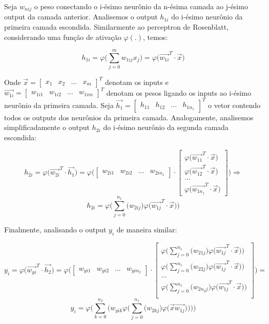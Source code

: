 \documentclass[
	12pt,				%
	oneside,			%
	a4paper,			%
	english,			%
	french,				%
	spanish,			%
	brazil,				%
	]{abntex2}
\begin{document}
Seja $w_{nij}$ o peso conectando o i-\'esimo neur\^onio da n-\'esima camada ao j-\'esimo output da camada anterior. Analisemos o output $h_{1i}$ do i-\'esimo neur\^onio da primeira camada escondida.  Similarmente ao perceptron de Rosenblatt, considerando uma fun\c{c}\~ao de ativa\c{c}\~ao $\varphi(.)$, temos:

$$h_{1i} =  \varphi \bigg( \sum_{j=0}^m w_{1ij} x_j  \bigg) = \varphi \big(\vec{w_{1i}}^T \cdot \vec{x} \big) $$

Onde $\vec{x} = \begin{bmatrix}
x_1 & x_2 & ... & x_m
\end{bmatrix}^T$ denotam os inputs e $\vec{w_{1i}} = \begin{bmatrix}
w_{1i1} & w_{1i2} & ... & w_{1im} \end{bmatrix}^T$ denotam os pesos ligando os inputs ao i-\'esimo neur\^onio da primeira camada. Seja $\vec{h_1} = \begin{bmatrix}
h_{11} &
h_{12} &
... &
h_{1 n_1}
\end{bmatrix}^T$ o vetor contendo todos os outputs dos neur\^onios da primeira camada. Analogamente, analisemos simplificadamente o output $h_{2i}$ do i-\'esimo neur\^onio da segunda camada escondida:

$$h_{2i} = \varphi \big( \vec{w_{2i}}^T \cdot \vec{h_1}  ) = 
\varphi \bigg(
\begin{bmatrix}
w_{2i1} & w_{2i2} & ... & w_{2in_1}
\end{bmatrix} \cdot 
\begin{bmatrix}
\varphi \big(\vec{w_{11}}^T \cdot \vec{x} ) \\
\varphi \big(\vec{w_{12}}^T \cdot \vec{x} ) \\

...  \\
\varphi \big(\vec{w_{1n_1}}^T \cdot \vec{x} )
\end{bmatrix} 
\bigg) \Rightarrow
$$
$$ h_{2i} = \varphi \bigg(
\sum_{j = 0}^{n_1} \big(w_{2ij}\big) \varphi \big(\vec{w_{1j}}^T \cdot \vec{x} )  
\bigg) $$

Finalmente, analisando o output $y_i$ de maneira similar:

$$y_i = \varphi \big( \vec{w_{yi}}^T \cdot \vec{h_2}) = 
\varphi \Bigg( \begin{bmatrix}
w_{yi1} & w_{yi2} & ... & w_{yin_2}
\end{bmatrix} \cdot 
\begin{bmatrix}
\varphi \bigg(
\sum_{j = 0}^{n_1} \big(w_{21j}\big)  \varphi \big(\vec{w_{1j}}^T \cdot \vec{x} )\bigg) \\
\varphi \bigg(
\sum_{j = 0}^{n_1}\big( w_{22j}\big)  \varphi \big(\vec{w_{1j}}^T \cdot \vec{x} )\bigg) \\
... \\
\varphi \bigg(
\sum_{j = 0}^{n_1}\big( w_{2n_2j}\big)  \varphi \big(\vec{w_{1j}}^T \cdot \vec{x} ) \bigg) \\
\end{bmatrix} \Bigg) =
$$
$$y_i = \varphi \Bigg( \sum_{k=0}^{n_2}\bigg( 
w_{yik}  \varphi \Big(
\sum_{j = 0}^{n_1}\big( w_{2kj}\big)  \varphi \big( \vec{x}  \vec{w_{1j}} ) \Big) 
\bigg) \Bigg)$$
\end{document}
